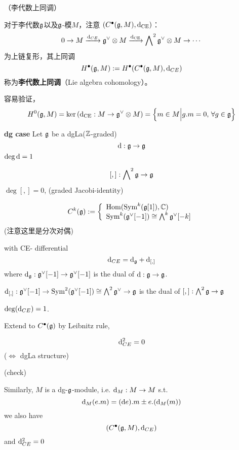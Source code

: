 \begin{rem}（李代数上同调）

对于李代数$\mathfrak{g}$以及$\mathfrak{g}$-模$M$，注意
$(C^{\bullet}(\mathfrak{g},M),\mathrm{d}_{\operatorname{CE}})$：
$$0\to M\xrightarrow{\mathrm{d}_{CE}}\mathfrak{g}^\vee\otimes M\xrightarrow{\mathrm{d}_{\operatorname{CE}}}
\bigwedge\nolimits^{2}\mathfrak{g}^\vee \otimes M\to\cdots$$
为上链复形，其上同调
$$H^{\bullet}(\mathfrak{g},M):=H^{\bullet}(C^{\bullet}(\mathfrak{g},M),\mathrm{d}_{CE})$$
称为\textbf{李代数上同调}（Lie algebra cohomology）。
\end{rem}

容易验证，
$$H^0(\mathfrak{g},M)=\ker\left(\mathrm{d}_{\operatorname{CE}}:M\to\mathfrak{g}^\vee\otimes M\right)
=\Big\{ m\in M \Big| g.m=0,\,\forall g\in\mathfrak{g} \Big\}$$




\textbf{dg case}
Let $\mathfrak{g}$ be a dgLa($\mathbb{Z}$-graded)
$$\mathrm{d}:\mathfrak{g}\to\mathfrak{g}$$
$\deg\mathrm{d}=1$

$$[,]:\bigwedge\nolimits^{2}\mathfrak{g}\to\mathfrak{g}$$
$\deg[,]=0$,
(graded Jacobi-identity)

\begin{definition}
$$
  C^k(\mathfrak{g}):=
    \left\{
      \begin{array}{l}
        \operatorname{Hom}(\operatorname{Sym}^k(\mathfrak{g}[1]),\mathbb{C})  \\
        \operatorname{Sym}^k(\mathfrak{g}^\vee[-1])\cong\bigwedge\nolimits^{k}\mathfrak{g}^\vee[-k]
      \end{array}
    \right.
$$
(注意这里是分次对偶)

with CE- differential
$$\mathrm{d}_{CE}=\mathrm{d}_{\mathfrak{g}}+\mathrm{d}_{[,]}$$
where $\mathrm{d}_{\mathfrak{g}}:\mathfrak{g}^\vee[-1]\to\mathfrak{g}^\vee[-1]$ is the dual of $\mathrm{d}:\mathfrak{g}\to\mathfrak{g}$.

$\mathrm{d}_{[,]}:\mathfrak{g}^\vee[-1]\to \operatorname{Sym}^2(\mathfrak{g}^\vee[-1])\cong\bigwedge\nolimits^{2}\mathfrak{g}^\vee\to\mathfrak{g}$
is the dual of $[,]:\bigwedge\nolimits^{2}\mathfrak{g}\to\mathfrak{g}$
\end{definition}

$\deg(\mathrm{d}_{CE})=1$.

Extend to $C^{\bullet}(\mathfrak{g})$ by Leibnitz rule,
\begin{prop}
$$\mathrm{d}_{CE}^2=0$$
($\iff$ dgLa structure)
\end{prop}
(check)

Similarly, $M$ is a dg-$\mathfrak{g}$-module, i.e.
$\mathrm{d}_M:M\to M$ s.t.
$$\mathrm{d}_M(e.m)=(\mathrm{d} e).m\pm e.(\mathrm{d}_M (m))$$
we also have
$$(C^{\bullet}(\mathfrak{g},M),\mathrm{d}_{CE})$$
and $\mathrm{d}_{CE}^2=0$

